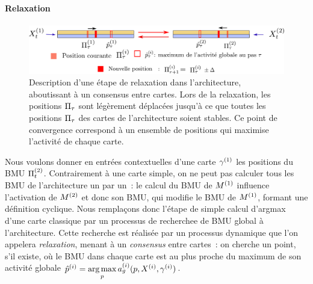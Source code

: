 \documentclass[../main]{subfiles}
\begin{document}
\paragraph{Relaxation}
\begin{figure}
    \centering
    \includegraphics[width=\textwidth]{relaxation_2maps.pdf}
    \caption{Description d'une étape de relaxation dans l'architecture, aboutissant à un consensus entre cartes. Lors de la relaxation, les positions $\Pi_\tau$ sont légèrement déplacées jusqu'à ce que toutes les positions $\Pi_\tau$ des cartes de l'architecture soient stables. Ce point de convergence correspond à un ensemble de positions qui maximise l'activité de chaque carte. \label{fig:relax}}
    \end{figure}

Nous voulons donner en entrées contextuelles d'une carte $\gamma^{({1})}$ les positions du BMU $\Pi^{({2})}_t$.
Contrairement à une carte simple, on ne peut pas calculer tous les BMU de l'architecture un par un~: le calcul du BMU de $M^{({1})}$ influence l'activation de $M^{({2})}$ et donc son BMU, qui modifie le BMU de $M^{({1})}$, formant une définition cyclique.
Nous remplaçons donc l'étape de simple calcul d'argmax d'une carte classique par un processus de recherchee de BMU global à l'architecture. Cette recherche est réalisée par un processus dynamique que l'on appelera \emph{relaxation}, menant à un \emph{consensus} entre cartes~: on cherche un point, s'il existe, où le BMU dans chaque carte est au plus proche du maximum de son activité globale $\hat{p}^{({i})} = \operatorname*{arg\,max}\limits_p a_g^{({i})}(p, X^{({i})}, \gamma^{({i})})$.
\end{document}
